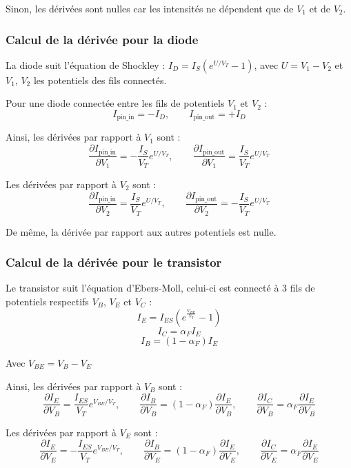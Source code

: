 \documentclass[12pt,a4paper]{article}
\begin{document}
Sinon, les dérivées sont nulles car les intensités ne dépendent que de $V_1$ et de $V_2$.


\subsubsection{Calcul de la dérivée pour la diode}

La diode suit l'équation de Shockley : $I_D = I_S(e^{U/V_T} - 1)$, avec $U = V_1 - V_2$ et $V_1$, $V_2$ les potentiels des fils connectés.

Pour une diode connectée entre les fils de potentiels $V_1$ et $V_2$ :
\[
  I_{\text{pin\_in}} = - I_D, \qquad I_{\text{pin\_out}} = + I_D
\]

Ainsi, les dérivées par rapport à $V_1$ sont : 
\[
  \frac{\partial I_{\text{pin\_in}}}{\partial V_1} = -\frac{I_S}{V_T} e^{U/V_T}, \qquad \frac{\partial I_{\text{pin\_out}}}{\partial V_1} = \frac{I_S}{V_T} e^{U/V_T}
\]

Les dérivées par rapport à $V_2$ sont :
\[
  \frac{\partial I_{\text{pin\_in}}}{\partial V_2} = \frac{I_S}{V_T} e^{U/V_T}, \qquad \frac{\partial I_{\text{pin\_out}}}{\partial V_2} = -\frac{I_S}{V_T} e^{U/V_T}
\]

De même, la dérivée par rapport aux autres potentiels est nulle. 

\subsubsection{Calcul de la dérivée pour le transistor}

Le transistor suit l'équation d'Ebers-Moll, celui-ci est connecté à 3 fils de potentiels respectifs $V_B$, $V_E$ et $V_C$ :
\[ I_E = I_{ES} \left( e^{\frac{V_{BE}}{ V_T}} - 1 \right)\]
\[ I_C = \alpha_F I_E\]
\[ I_B = \left ( 1 - \alpha_F \right ) I_E\]

Avec $V_{BE} = V_B - V_E$

Ainsi, les dérivées par rapport à $V_B$ sont : 
\[
  \frac{\partial I_E}{\partial V_B} = \frac{I_{ES}}{V_T} e^{V_{BE}/V_T}, \qquad \frac{\partial I_B}{\partial V_B} = (1 - \alpha_F) \frac{\partial I_E}{\partial V_B}, 
  \qquad \frac{\partial I_C}{\partial V_B} = \alpha_F \frac{\partial I_E}{\partial V_B} 
\]

Les dérivées par rapport à $V_E$ sont :
\[
  \frac{\partial I_E}{\partial V_E} = - \frac{I_{ES}}{V_T} e^{V_{BE}/V_T}, \qquad \frac{\partial I_B}{\partial V_E} = (1 - \alpha_F) \frac{\partial I_E}{\partial V_E}, 
  \qquad \frac{\partial I_C}{\partial V_E} = \alpha_F \frac{\partial I_E}{\partial V_E} 
\]
\end{document}
